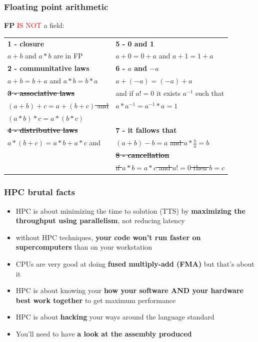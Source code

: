 \begin{frame}[containsverbatim]
\frametitle{Floating point arithmetic}
\textbf{FP} \textcolor{red}{IS NOT} a field:
{\footnotesize
\begin{center}
\begin{table}
\begin{tabular}{|l|l|} 
\hline
\textbf{1 - closure}  & \textbf{5 - 0 and 1}  \\
$a + b$ and $a * b$ are in FP &  $a + 0 = 0 + a$ and $a + 1 = 1 + a$ \\
\hline
\textbf{2 - communitative laws}  & \textbf{6 - $a$ and $-a$}  \\
$a + b = b + a$  and $a * b = b * a$ &  $a + (-a) = (-a) + a$ \\
\hline
\textbf{\st{3 - associative laws}}  &  and if $a != 0$ it exists $a^{-1}$ such that \\
\st{$(a + b) + c = a + (b + c)$  and}  &  $a * a^{-1} = a^{-1} * a = 1$ \\
\st{$(a * b) * c = a * (b * c)$} & \\
\hline
\textbf{\st{4 - distributive laws}}  &  \textbf{7 - it fallows that} \\
$a * (b + c) = a * b + a * c$  and  &  $(a + b) -b = a$ \st{and $a * \frac{b}{a} = b$} \\
\hline
 &  \textbf{\st{8 - cancellation}} \\
 & \st{if $a * b = a * c$ and $a != 0$ then $b = c$}  \\
\hline
\end{tabular}
\end{table}
\end{center}
}
\end{frame}



\begin{frame}[containsverbatim]
\frametitle{HPC brutal facts}
\begin{itemize}
\item HPC is about minimizing the time to solution (TTS) by \textbf{maximizing the throughput using parallelism}, not reducing latency
\item without HPC techniques, \textbf{your code won't run faster on supercomputers} than on your workstation
\item CPUs are very good at doing \textbf{fused multiply-add (FMA)} but that's about it
\item HPC is about knowing your \textbf{how your software AND your hardware best work together} to get maximum performance
\item HPC is about \textbf{hacking} your ways around the language standard
\item You'll need to have \textbf{a look at the assembly produced}
\end{itemize}
\end{frame}


